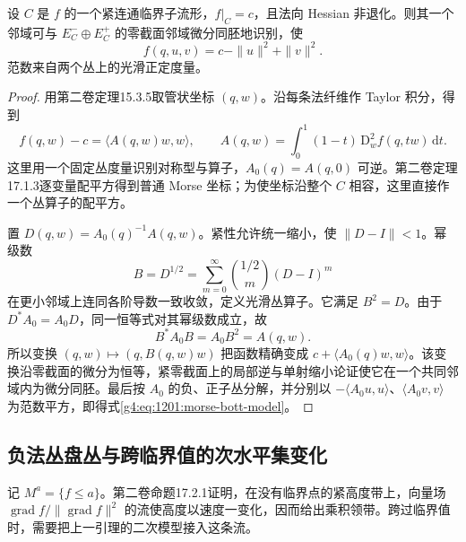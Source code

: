\begin{lemma}\label{g4:lem:1201:morse-bott}
	设 \(C\) 是 \(f\) 的一个紧连通临界子流形，\(f|_C=c\)，且法向 Hessian 非退化。则其一个邻域可与 \(E_C^-\oplus E_C^+\) 的零截面邻域微分同胚地识别，使
	\begin{equation}\label{g4:eq:1201:morse-bott-model}
		f(q,u,v)=c-\|u\|^2+\|v\|^2.
	\end{equation}
	范数来自两个丛上的光滑正定度量。
\end{lemma}
\begin{proof}
	用第二卷定理15.3.5取管状坐标 \((q,w)\)。沿每条法纤维作 Taylor 积分，得到
	\[
		f(q,w)-c=\langle A(q,w)w,w\rangle,
		\qquad
		A(q,w)=\int_0^1(1-t)\,\mathrm D_w^2f(q,tw)\,\mathrm dt.
	\]
	这里用一个固定丛度量识别对称型与算子，\(A_0(q)=A(q,0)\) 可逆。第二卷定理17.1.3逐变量配平方得到普通 Morse 坐标；为使坐标沿整个 \(C\) 相容，这里直接作一个丛算子的配平方。

	置 \(D(q,w)=A_0(q)^{-1}A(q,w)\)。紧性允许统一缩小，使 \(\|D-I\|<1\)。幂级数
	\[
		B=D^{1/2}=\sum_{m=0}^{\infty}\binom{1/2}{m}(D-I)^m
	\]
	在更小邻域上连同各阶导数一致收敛，定义光滑丛算子。它满足 \(B^2=D\)。由于 \(D^*A_0=A_0D\)，同一恒等式对其幂级数成立，故
	\[
		B^*A_0B=A_0B^2=A(q,w).
	\]
	所以变换 \((q,w)\mapsto(q,B(q,w)w)\) 把函数精确变成 \(c+\langle A_0(q)w,w\rangle\)。该变换沿零截面的微分为恒等，紧零截面上的局部逆与单射缩小论证使它在一个共同邻域内为微分同胚。最后按 \(A_0\) 的负、正子丛分解，并分别以 \(-\langle A_0u,u\rangle\)、\(\langle A_0v,v\rangle\) 为范数平方，即得式\eqref{g4:eq:1201:morse-bott-model}。
\end{proof}

\subsection{负法丛盘丛与跨临界值的次水平集变化}
\label{g4:subsec:1201:04}

记 \(M^a=\{f\leq a\}\)。第二卷命题17.2.1证明，在没有临界点的紧高度带上，向量场 \(\operatorname{grad}f/\|\operatorname{grad}f\|^2\) 的流使高度以速度一变化，因而给出乘积领带。跨过临界值时，需要把上一引理的二次模型接入这条流。


